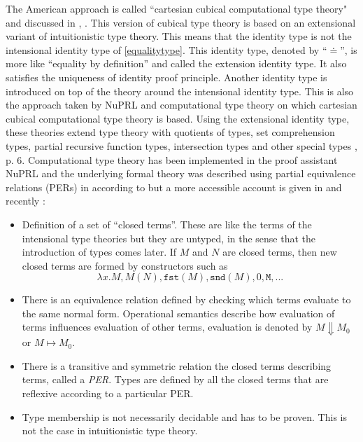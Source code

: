 \documentclass[11pt,a4paper,twoside,xetex,draft]{book}
\newcommand{\keyword}[1]{\emph{#1}\index{#1}}
\begin{document}
The American approach is called ``cartesian cubical computational type theory" and discussed in  \cite{Angiuli2017_2}, \cite{Angiuli2018}. This version of cubical type theory is based on an extensional variant of intuitionistic type theory. This means that the identity type is not the intensional identity type of \cref{equalitytype}. This identity type, denoted by ``$\doteq$'', is more like ``equality by definition'' and called the extension identity type. It also satisfies the uniqueness of identity proof principle. Another identity type is introduced on top of the theory around the intensional identity type. This is also the approach taken by NuPRL and computational type theory on which cartesian cubical computational type theory is based. Using the extensional identity type, these theories extend type theory with quotients of types, set comprehension types, partial recursive function types, intersection types and other special types \cite{Constable2011}, p. 6.  Computational type theory has been implemented in the proof assistant NuPRL and the underlying formal theory was described using partial equivalence relations (PERs) in \cite{Allen1987} according to \cite{Angiuli2018} but a more accessible account is given in \cite{Constable2003} and recently \cite{Constable2015July}: 

\begin{itemize}
 \item Definition of a set of ``closed terms''. These are like the terms of the intensional type theories but they are untyped, in the sense that the introduction of types comes later. If $M$ and $N$ are closed terms, then new closed terms are formed by constructors such as $$\lambda x . M, M (N), \texttt{fst}(M), \texttt{snd}(M), 0, \texttt{M}, ...$$
 \item There is an equivalence relation defined by checking which terms evaluate to the same normal form.  Operational semantics describe how evaluation of terms influences evaluation of other terms, evaluation is denoted by $M \Downarrow M_0$ or $M \mapsto M_0$.
 \item There  is a transitive and symmetric relation the closed terms describing terms, called a \keyword{PER}. Types are defined by all the closed terms that are reflexive according to a particular PER.
 \item Type membership is not necessarily decidable and has to be proven. This is not the case in intuitionistic type theory.
\end{itemize}
\end{document}
